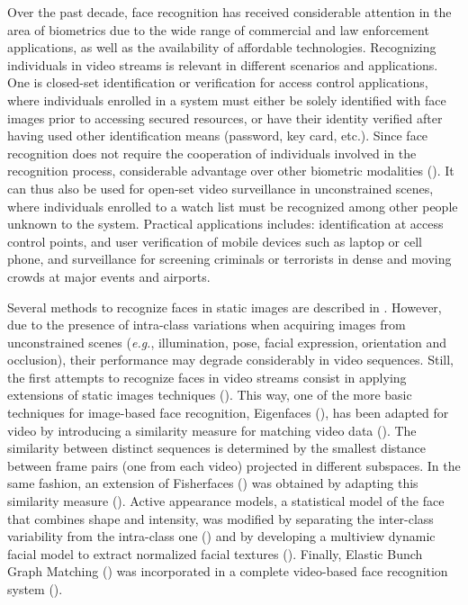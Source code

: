 Over the past decade, face recognition has received considerable attention in the area of biometrics due to the wide range of commercial and law enforcement applications, as well as the availability of affordable technologies.
Recognizing individuals in video streams is relevant in different scenarios and applications.
One is closed-set identification or verification for access control applications, where individuals enrolled in a system must either be solely identified with face images prior to accessing secured resources, or have their identity verified after having used other identification means (password, key card, etc.).
Since face recognition does not require the cooperation of individuals involved in the recognition process, considerable advantage over other biometric modalities (\cite{jain05, zhao03}).
It can thus also be used for open-set video surveillance in unconstrained scenes, where individuals enrolled to a watch list must be recognized among other people unknown to the system.
Practical applications includes: identification at access control points, and user verification of mobile devices such as laptop or cell phone, and surveillance for screening criminals or terrorists in dense and moving crowds at major events and airports.

Several methods to recognize faces in static images are described in \cite{jain05, zhang09,zhao03}.
However, due to the presence of intra-class variations when acquiring images from unconstrained scenes (\emph{e.g.}, illumination, pose, facial expression, orientation and occlusion), their performance may degrade considerably in video sequences. 
Still, the first attempts to recognize faces in video streams consist in applying extensions of static images techniques (\cite{matta09}).
This way, one of the more basic techniques for image-based face recognition, Eigenfaces (\cite{turk91}), has been adapted for video by introducing a similarity measure for matching video data (\cite{maeda99, satoh00}).
The similarity between distinct sequences is determined by the smallest distance between frame pairs (one from each video) projected in different subspaces. 
In the same fashion, an extension of Fisherfaces (\cite{belhumeur97}) was obtained by adapting this similarity measure (\cite{satoh00}).
Active appearance models, a statistical model of the face that combines shape and intensity, was modified by separating the inter-class variability from the intra-class one (\cite{edwards99}) and by developing a multiview dynamic facial model to extract normalized facial textures (\cite{li01_face}).
Finally, Elastic Bunch Graph Matching (\cite{wiskott97}) was incorporated in a complete video-based face recognition system (\cite{steffens98}).

